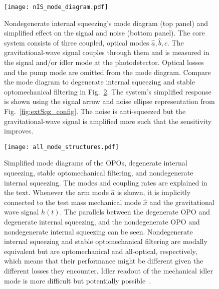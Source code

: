 \begin{figure}
    \centering
    \texttt{[image: nIS\_mode\_diagram.pdf]}
    \caption{ Nondegenerate internal squeezing's mode diagram (top panel) and simplified effect on the signal and noise (bottom panel). The core system consists of three coupled, optical modes $\hat a,\hat b,\hat c$. The gravitational-wave signal couples through them and is measured in the signal and/or idler mode at the photodetector. Optical losses and the pump mode are omitted from the mode diagram. Compare the mode diagram to degenerate internal squeezing and stable optomechanical filtering in Fig.~\ref{fig:mode_diagram}. The system's simplified response is shown using the signal arrow and noise ellipse representation from Fig.~\ref{fig:extSqz_config}. The noise is anti-squeezed but the gravitational-wave signal is amplified more such that the sensitivity improves.}
    \label{fig:nIS_mode_diagram}
\end{figure}
\begin{figure}
    \centering
    \texttt{[image: all\_mode\_structures.pdf]}
    \caption{Simplified mode diagrams of the OPOs, degenerate internal squeezing, stable optomechanical filtering, and nondegenerate internal squeezing. The modes and coupling rates are explained in the text. Whenever the arm mode $\hat a$ is shown, it is implicitly connected to the test mass mechanical mode $\hat x$ and the gravitational wave signal $h(t)$. The parallels between the degenerate OPO and degenerate internal squeezing, and the nondegenerate OPO and nondegenerate internal squeezing can be seen. Nondegenerate internal squeezing and stable optomechanical filtering are modally equivalent but are optomechanical and all-optical, respectively, which means that their performance might be different given the different losses they encounter. Idler readout of the mechanical idler mode is more difficult but potentially possible~\cite{liEnhancingInterferometerSensitivity2021}.}
    \label{fig:mode_diagram}
\end{figure}

